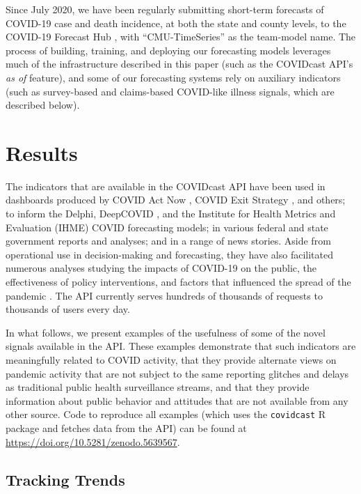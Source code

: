 \documentclass[11pt]{article}
\begin{document}
Since July 2020, we have been regularly submitting short-term forecasts of
COVID-19 case and death incidence, at both the state and county levels, to the
COVID-19 Forecast Hub \cite{ForecastHub}, with ``CMU-TimeSeries'' as the
team-model name.  The process of building, training, and deploying our
forecasting models leverages much of the infrastructure described in this paper
(such as the COVIDcast API's \textit{as of} feature), and some of our
forecasting systems rely on auxiliary indicators (such as survey-based and
claims-based COVID-like illness signals, which are described below).

\section{Results}

The indicators that are available in the COVIDcast API have been used in
dashboards produced by COVID Act Now \cite{CovidActNow}, COVID Exit Strategy
\cite{CovidExitStrategy}, and others; to inform the Delphi, DeepCOVID
\cite{Rodriguez:2021}, and the Institute for Health Metrics and Evaluation
(IHME) \cite{IHMEProj} COVID forecasting models; in various federal and state
government reports and analyses; and in a range of news stories. Aside from
operational use in decision-making and forecasting, they have also facilitated
numerous analyses studying the impacts of COVID-19 on the public, the
effectiveness of policy interventions, and factors that influenced the spread of
the pandemic \cite{Adjodah:2021, Pierri:2021, Jewell:2021, Chakrabarti:2020,
  Doerr:2021, Rebeiro:2021}. The API currently serves hundreds of thousands of
requests to thousands of users every day.

In what follows, we present examples of the usefulness of some of the novel
signals available in the API. These examples demonstrate that such indicators
are meaningfully related to COVID activity, that they provide alternate views on
pandemic activity that are not subject to the same reporting glitches and delays
as traditional public health surveillance streams, and that they provide
information about public behavior and attitudes that are not available from any
other source. Code to reproduce all examples (which uses the \texttt{covidcast}
R package and fetches data from the API) can be found at
\url{https://doi.org/10.5281/zenodo.5639567}.

\subsection{Tracking Trends}
\end{document}
